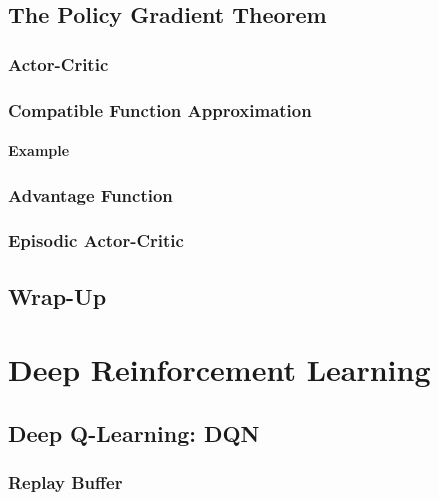 	\section{The Policy Gradient Theorem} %

		\subsection{Actor-Critic} %

		\subsection{Compatible Function Approximation} %

			\subsubsection{Example} %

		\subsection{Advantage Function} %

		\subsection{Episodic Actor-Critic} %

	\section{Wrap-Up} %

\chapter{Deep Reinforcement Learning} %

	\section{Deep Q-Learning: DQN} %

		\subsection{Replay Buffer} %

